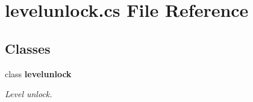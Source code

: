 \section{levelunlock.\+cs File Reference}
\label{levelunlock_8cs}
\subsection*{Classes}
\begin{DoxyCompactItemize}
\item 
class {\bf levelunlock}
\begin{DoxyCompactList}\small\item\em Level unlock. \end{DoxyCompactList}\end{DoxyCompactItemize}
